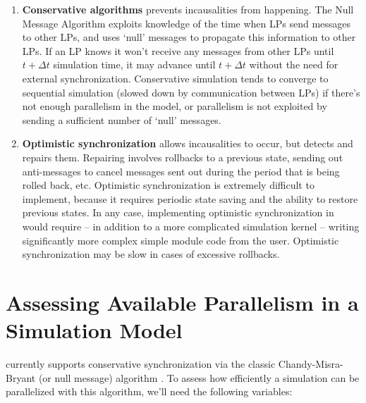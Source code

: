 \begin{enumerate}
  \item{\textbf{Conservative algorithms}
    prevents incausalities from happening. The Null Message Algorithm
    exploits knowledge of the time when LPs send messages to other LPs,
    and uses `null' messages to propagate this information to other LPs.
    If an LP knows it won't receive any messages from other
    LPs until $t+\Delta t$ simulation time, it may advance until
    $t+\Delta t$ without the need for external synchronization.
    Conservative simulation tends to converge to sequential simulation
    (slowed down by communication between LPs) if there's not
    enough parallelism in the model, or parallelism is not exploited
    by sending a sufficient number of `null' messages.}

  \item{\textbf{Optimistic synchronization}
    allows incausalities to occur, but detects and
    repairs them. Repairing involves rollbacks to a previous state,
    sending out anti-messages to cancel messages sent out during the
    period that is being rolled back, etc.  Optimistic synchronization
    is extremely difficult to implement, because it requires periodic
    state saving and the ability to restore previous states. In any
    case, implementing optimistic synchronization in {\opp} would
    require -- in addition to a more complicated simulation kernel --
    writing significantly more complex simple
    module code from the user.  Optimistic synchronization may be slow
    in cases of excessive rollbacks.}
\end{enumerate}


\section{Assessing Available Parallelism in a Simulation Model}

{\opp} currently supports conservative synchronization
via the classic Chandy-Misra-Bryant (or null message) algorithm
\cite{chandymisra79}.
To assess how efficiently a simulation can be parallelized
with this algorithm, we'll need the following variables:

